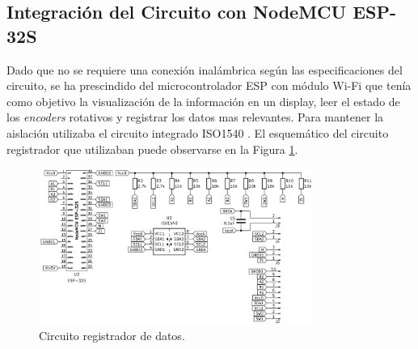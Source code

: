 \subsection{Integración del Circuito con NodeMCU ESP-32S}
Dado que no se requiere una conexión inalámbrica según las especificaciones del circuito, se ha prescindido del microcontrolador ESP con módulo Wi-Fi que tenía como objetivo la visualización de la información en un display, leer el estado de los \textit{encoders} rotativos y registrar los datos mas relevantes. Para mantener la aislación utilizaba el circuito integrado ISO1540 \cite{ISO1540}. El esquemático del circuito registrador que utilizaban puede observarse en la Figura \ref{F:ESP_32S}.
\begin{figure}[H]
    \centering
    \includegraphics[width=0.8\textwidth]{./imagenes/ESP_32S.png}
    \caption{Circuito registrador de datos.}
    \label{F:ESP_32S}
\end{figure}

